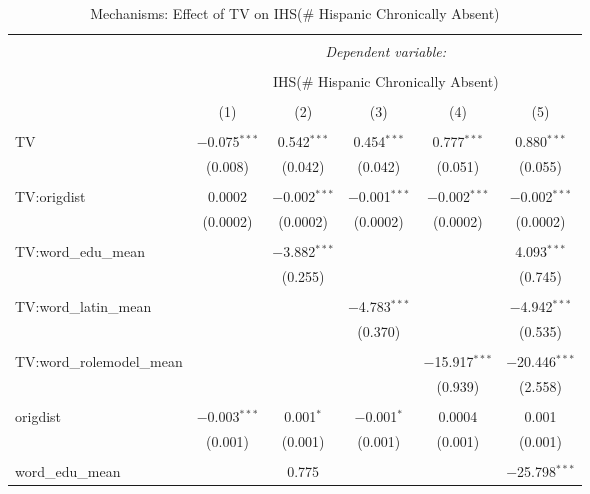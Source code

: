 
\begin{table}[!htbp] \centering 
  \caption{Mechanisms: Effect of TV on IHS(\# Hispanic Chronically Absent)} 
  \label{} 
\begin{tabular}{@{\extracolsep{-2pt}}lccccc} 
\\[-1.8ex]\hline 
\hline \\[-1.8ex] 
 & \multicolumn{5}{c}{\textit{Dependent variable:}} \\ 
\cline{2-6} 
\\[-1.8ex] & \multicolumn{5}{c}{IHS(\# Hispanic Chronically Absent)} \\ 
\\[-1.8ex] & (1) & (2) & (3) & (4) & (5)\\ 
\hline \\[-1.8ex] 
 TV & $-$0.075$^{***}$ & 0.542$^{***}$ & 0.454$^{***}$ & 0.777$^{***}$ & 0.880$^{***}$ \\ 
  & (0.008) & (0.042) & (0.042) & (0.051) & (0.055) \\ 
  & & & & & \\ 
 TV:origdist & 0.0002 & $-$0.002$^{***}$ & $-$0.001$^{***}$ & $-$0.002$^{***}$ & $-$0.002$^{***}$ \\ 
  & (0.0002) & (0.0002) & (0.0002) & (0.0002) & (0.0002) \\ 
  & & & & & \\ 
 TV:word\_edu\_mean &  & $-$3.882$^{***}$ &  &  & 4.093$^{***}$ \\ 
  &  & (0.255) &  &  & (0.745) \\ 
  & & & & & \\ 
 TV:word\_latin\_mean &  &  & $-$4.783$^{***}$ &  & $-$4.942$^{***}$ \\ 
  &  &  & (0.370) &  & (0.535) \\ 
  & & & & & \\ 
 TV:word\_rolemodel\_mean &  &  &  & $-$15.917$^{***}$ & $-$20.446$^{***}$ \\ 
  &  &  &  & (0.939) & (2.558) \\ 
  & & & & & \\ 
 origdist & $-$0.003$^{***}$ & 0.001$^{*}$ & $-$0.001$^{*}$ & 0.0004 & 0.001 \\ 
  & (0.001) & (0.001) & (0.001) & (0.001) & (0.001) \\ 
  & & & & & \\ 
 word\_edu\_mean &  & 0.775 &  &  & $-$25.798$^{***}$ \\ 

\end{tabular}
\end{table}
